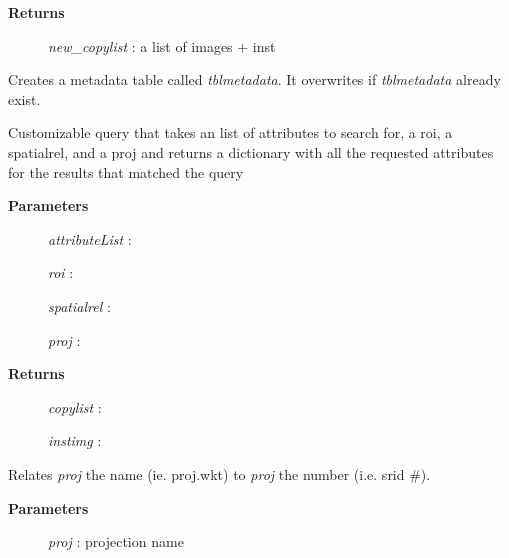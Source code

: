 \documentclass[letterpaper,10pt,english]{sphinxmanual}
\begin{document}
\begin{fulllineitems}
\begin{fulllineitems}
\begin{description}
\item[{\textbf{Returns}}] \leavevmode
\emph{new\_copylist}  :   a list of images + inst

\end{description}

\end{fulllineitems}


\begin{fulllineitems}
\label{code:Database.Database.createTblMetadata}
Creates a metadata table called \emph{tblmetadata}. It overwrites if \emph{tblmetadata} already exist.

\end{fulllineitems}


\begin{fulllineitems}
\label{code:Database.Database.customizedQuery}
Customizable query that takes an list of attributes to search for, a roi, a spatialrel, and a proj
and returns a dictionary with all the requested attributes for the results that matched the query
\begin{description}
\item[{\textbf{Parameters}}] \leavevmode
\emph{attributeList} :

\emph{roi}   :

\emph{spatialrel}    :

\emph{proj}  :

\item[{\textbf{Returns}}] \leavevmode
\emph{copylist}  :

\emph{instimg}   :

\end{description}

\end{fulllineitems}


\begin{fulllineitems}
\label{code:Database.Database.dbProj}
Relates \emph{proj} the name (ie. proj.wkt) to \emph{proj} the number (i.e. srid \#).
\begin{description}
\item[{\textbf{Parameters}}] \leavevmode
\emph{proj}  :   projection name


\end{description}
\end{fulllineitems}
\end{fulllineitems}
\end{document}
